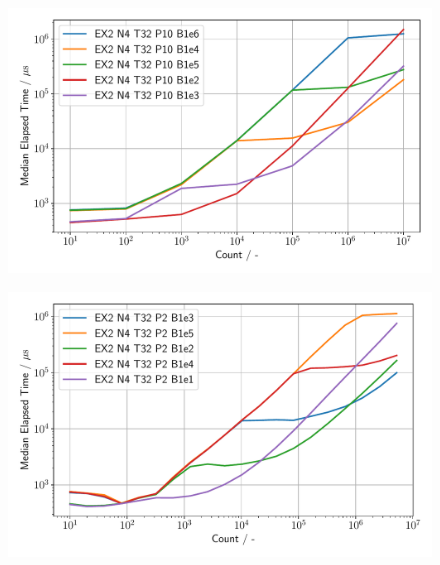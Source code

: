 \begin{figure}[h]
\centering
    \begin{minipage}{.5\textwidth}
        \centering
        \includegraphics[width=1.0\linewidth]{figures/Ex2_4.pdf}
        \label{Ex2_4_p}
    \end{minipage}%
    \begin{minipage}{.5\textwidth}
        \centering
        \includegraphics[width=1.0\linewidth]{figures/Ex2_5.pdf}
        \label{Ex2_5_p}
    \end{minipage}
\end{figure}




